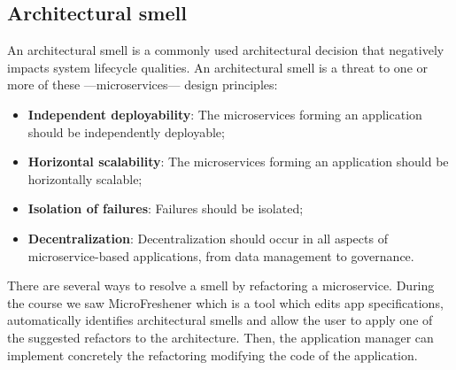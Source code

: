 \subsection{Architectural smell}
An architectural smell is a commonly used architectural decision that negatively impacts system lifecycle qualities. An architectural smell is a threat to one or more of these {---}microservices{---} design principles:
\begin{itemize}
   \item \textbf{Independent deployability}: The microservices forming an application should be independently deployable;
   \item \textbf{Horizontal scalability}: The microservices forming an application should be horizontally scalable;
   \item \textbf{Isolation of failures}: Failures should be isolated;
   \item \textbf{Decentralization}: Decentralization should occur in all aspects of microservice-based applications, from data management to governance.
\end{itemize}
There are several ways to resolve a smell by refactoring a microservice. During the course we saw MicroFreshener which is a tool which edits app specifications, automatically identifies architectural smells and allow the user to apply one of the suggested refactors to the architecture. Then, the application manager can implement concretely the refactoring modifying the code of the application.

